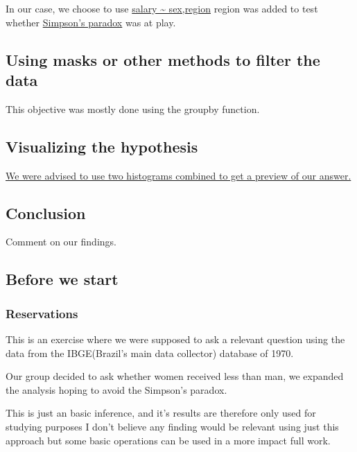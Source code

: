 \documentclass[]{article}
\begin{document}
In our case, we choose to use
\protect\hyperlink{python_hypothesis_testing}{salary \textasciitilde{}
sex,region} region was added to test whether
\href{https://en.wikipedia.org/wiki/Simpson\%27s_paradox}{Simpson's
paradox} was at play.

\hypertarget{using-masks-or-other-methods-to-filter-the-data}{%
\subsection{Using masks or other methods to filter the
data}\label{using-masks-or-other-methods-to-filter-the-data}}

This objective was mostly done using the groupby function.

\hypertarget{visualizing-the-hypothesis}{%
\subsection{Visualizing the
hypothesis}\label{visualizing-the-hypothesis}}

\protect\hyperlink{python_plot_histograms}{We were advised to use two
histograms combined to get a preview of our answer.}

\hypertarget{conclusion}{%
\subsection{Conclusion}\label{conclusion}}

Comment on our findings.

\hypertarget{before-we-start}{%
\subsection{Before we start}\label{before-we-start}}

\hypertarget{reservations}{%
\subsubsection{Reservations}\label{reservations}}

This is an exercise where we were supposed to ask a relevant question
using the data from the IBGE(Brazil's main data collector) database of
1970.

Our group decided to ask whether women received less than man, we
expanded the analysis hoping to avoid the Simpson's paradox.

This is just an basic inference, and it's results are therefore only
used for studying purposes I don't believe any finding would be relevant
using just this approach but some basic operations can be used in a more
impact full work.
\end{document}

